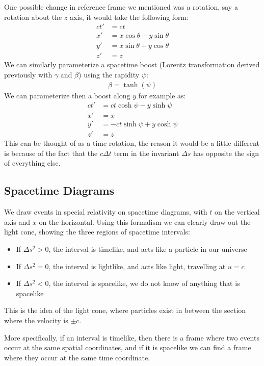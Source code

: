 \documentclass[12pt]{article}
\begin{document}
One possible change in reference frame we mentioned was a rotation, say a rotation about the $z$ axis, it would take the following form:
\begin{align*}
  ct' &= ct \\
  x'  &= x \cos\theta - y\sin\theta\\
  y'  &= x \sin\theta + y\cos\theta\\
  z'  &= z
\end{align*}
We can similarly parameterize a spacetime boost (Lorentz transformation derived previously with $\gamma$ and $\beta$) using the rapidity $\psi$:
\begin{align*}
  \beta=\tanh(\psi)
\end{align*}
We can parameterize then a boost along $y$ for example as:
\begin{align*}
  ct' &= ct\cosh\psi - y\sinh\psi \\
  x'  &= x \\
  y'  &= -ct\sinh\psi + y\cosh\psi\\
  z'  &= z
\end{align*}
This can be thought of as a time rotation, the reason it would be a little different is because of the fact that the $c\Delta{t}$ term in the invariant $\Delta{s}$ has opposite the sign of everything else.

\subsection{Spacetime Diagrams}
We draw events in special relativity on spacetime diagrams, with $t$ on the vertical axis and $x$ on the horizontal. Using this formalism we can clearly draw out the light cone, showing the three regions of spacetime intervals:
\begin{itemize}
\item If $\Delta{s}^2>0$, the interval is timelike, and acts like a particle in our universe
\item If $\Delta{s}^2=0$, the interval is lightlike, and acts like light, travelling at $u=c$
\item If $\Delta{s}^2<0$, the interval is spacelike, we do not know of anything that is spacelike
\end{itemize}
This is the idea of the light cone, where particles exist in between the section where the velocity is $\pm c$.

More specifically, if an interval is timelike, then there is a frame where two events occur at the same spatial coordinates, and if it is spacelike we can find a frame where they occur at the same time coordinate.
\end{document}
